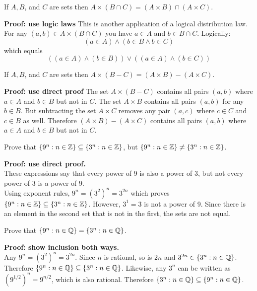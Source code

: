 \documentclass{article}
\begin{document}
\begin{problem}
If $A, B$, and $C$ are sets then $A \times (B \cap C) = (A \times B) \cap (A \times C)$.
\end{problem}
\textbf{Proof: use logic laws}
This is another application of a logical distribution law. For any $(a, b) \in A \times (B \cap C)$ you have $a \in A$ and $b \in B \cap C$. Logically:
$$ (a \in A) \land (b \in B \land b \in C)$$
which equals
$$((a \in A) \land (b \in B)) \lor ((a \in A) \land (b \in C))$$

\begin{problem}
If $A, B$, and $C$ are sets then $A \times (B - C) = (A \times B) - (A \times C)$.
\end{problem}
\textbf{Proof: use direct proof}
The set $A \times (B - C)$ contains all pairs $(a, b)$ where $a \in A$ and $b \in B$ but not in $C$. The set $A \times B$ contains all pairs $(a, b)$ for any $b \in B$. But subtracting the set $A \times C$ removes any pair $(a, c)$ where $c \in C$ and $c \in B$ as well. Therefore $(A \times B) - (A \times C)$ contains all pairs $(a, b)$ where $a \in A$ and $b \in B$ but not in $C$.

\begin{problem}
Prove that $\{9^n : n \in \mathbb{Z}\} \subseteq \{3^n : n \in \mathbb{Z}\}$, but $\{9^n : n \in \mathbb{Z}\} \neq \{3^n : n \in \mathbb{Z}\}$.
\end{problem}
\textbf{Proof: use direct proof.}
\\

These expressions say that every power of 9 is also a power of 3, but not every power of 3 is a power of 9.
\\

Using exponent rules, $9^n = (3^2)^n = 3^{2n}$ which proves $\{9^n : n \in \mathbb{Z}\} \subseteq \{3^n : n \in \mathbb{Z}\}$. However, $3^1 = 3$ is not a power of 9. Since there is an element in the second set that is not in the first, the sets are not equal.

\begin{problem}
Prove that $\{9^n : n \in \mathbb{Q}\} = \{3^n : n \in \mathbb{Q}\}$.
\end{problem}
\textbf{Proof: show inclusion both ways.}
\\

Any $9^n = (3^2)^n = 3^{2n}$. Since $n$ is rational, so is $2n$ and $3^{2n} \in \{3^n : n \in \mathbb{Q}\}$. Therefore $\{9^n : n \in \mathbb{Q}\} \subseteq \{3^n : n \in \mathbb{Q}\}$. Likewise, any $3^n$ can be written as $(9^{1/2})^n = 9^{n/2}$, which is also rational. Therefore $\{3^n : n \in \mathbb{Q}\} \subseteq \{9^n : n \in \mathbb{Q}\}$.
\end{document}
